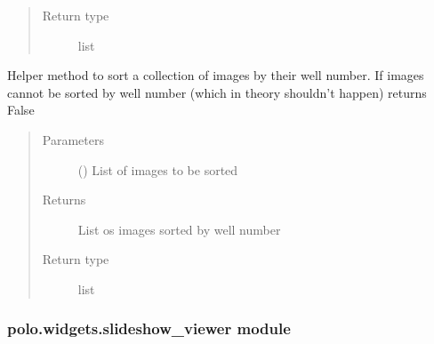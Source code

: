 \documentclass[letterpaper,10pt,english]{sphinxmanual}
\begin{document}
\begin{fulllineitems}
\begin{fulllineitems}
\begin{quote}
\begin{description}
\item[{Return type}] \leavevmode
list

\end{description}\end{quote}

\end{fulllineitems}


\begin{fulllineitems}
\label{\detokenize{polo.widgets:polo.widgets.slideshow_inspector.slideshowInspector.sort_images_by_well_number}}
Helper method to sort a collection of images by their well number.
If images cannot be sorted by well number (which in theory shouldn’t happen)
returns False
\begin{quote}\begin{description}
\item[{Parameters}] \leavevmode
{} () \textendash{} List of images to be sorted

\item[{Returns}] \leavevmode
List os images sorted by well number

\item[{Return type}] \leavevmode
list

\end{description}\end{quote}

\end{fulllineitems}


\end{fulllineitems}



\subsubsection{polo.widgets.slideshow\_viewer module}
\label{\detokenize{polo.widgets:module-polo.widgets.slideshow_viewer}}\label{\detokenize{polo.widgets:polo-widgets-slideshow-viewer-module}}
\end{document}
